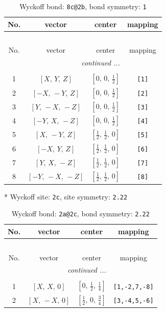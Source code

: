 \documentclass[fleqn,8pt]{jsarticle}
\begin{document}
\begin{longtable}{cccc}
\caption{Wyckoff bond: {\tt 8c@2b}, bond symmetry: {\tt 1}}
 \\
 \hline \hline
No. & vector & center & mapping \\ \hline \endfirsthead

\multicolumn{3}{l}{\tablename\ \thetable{}} \\
 \hline \hline
No. & vector & center & mapping \\ \hline \endhead

 \hline \hline
\multicolumn{3}{r}{\footnotesize\it continued ...} \\ \endfoot

 \hline \hline
\multicolumn{3}{r}{} \\ \endlastfoot

1 & $\left[ X,\, Y,\, Z \right]$ & $\left[ 0,\, 0,\, \frac{1}{2} \right]$ & {\tt [1]} \\ \hline
2 & $\left[ - X,\, - Y,\, Z \right]$ & $\left[ 0,\, 0,\, \frac{1}{2} \right]$ & {\tt [2]} \\ \hline
3 & $\left[ Y,\, - X,\, - Z \right]$ & $\left[ 0,\, 0,\, \frac{1}{2} \right]$ & {\tt [3]} \\ \hline
4 & $\left[ - Y,\, X,\, - Z \right]$ & $\left[ 0,\, 0,\, \frac{1}{2} \right]$ & {\tt [4]} \\ \hline
5 & $\left[ X,\, - Y,\, Z \right]$ & $\left[ \frac{1}{2},\, \frac{1}{2},\, 0 \right]$ & {\tt [5]} \\ \hline
6 & $\left[ - X,\, Y,\, Z \right]$ & $\left[ \frac{1}{2},\, \frac{1}{2},\, 0 \right]$ & {\tt [6]} \\ \hline
7 & $\left[ Y,\, X,\, - Z \right]$ & $\left[ \frac{1}{2},\, \frac{1}{2},\, 0 \right]$ & {\tt [7]} \\ \hline
8 & $\left[ - Y,\, - X,\, - Z \right]$ & $\left[ \frac{1}{2},\, \frac{1}{2},\, 0 \right]$ & {\tt [8]} \\
\end{longtable}
* Wyckoff site: {\tt 2c}, site symmetry: {\tt 2.22}
\renewcommand{\arraystretch}{1.2}
\begin{longtable}{cccc}
\caption{Wyckoff bond: {\tt 2a@2c}, bond symmetry: {\tt 2.22}}
 \\
 \hline \hline
No. & vector & center & mapping \\ \hline \endfirsthead

\multicolumn{3}{l}{\tablename\ \thetable{}} \\
 \hline \hline
No. & vector & center & mapping \\ \hline \endhead

 \hline \hline
\multicolumn{3}{r}{\footnotesize\it continued ...} \\ \endfoot

 \hline \hline
\multicolumn{3}{r}{} \\ \endlastfoot

1 & $\left[ X,\, X,\, 0 \right]$ & $\left[ 0,\, \frac{1}{2},\, \frac{1}{4} \right]$ & {\tt [1,-2,7,-8]} \\ \hline
2 & $\left[ X,\, - X,\, 0 \right]$ & $\left[ \frac{1}{2},\, 0,\, \frac{3}{4} \right]$ & {\tt [3,-4,5,-6]} \\
\end{longtable}
\end{document}
